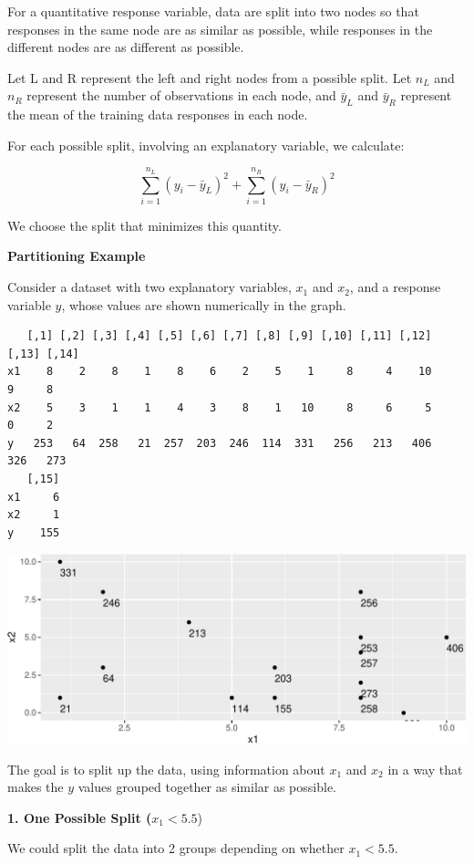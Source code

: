 \documentclass[
  letterpaper,
  DIV=11,
  numbers=noendperiod]{scrreprt}
\begin{document}
For a quantitative response variable, data are split into two nodes so
that responses in the same node are as similar as possible, while
responses in the different nodes are as different as possible.

Let L and R represent the left and right nodes from a possible split.
Let \(n_L\) and \(n_R\) represent the number of observations in each
node, and \(\bar{y}_L\) and \(\bar{y}_R\) represent the mean of the
training data responses in each node.

For each possible split, involving an explanatory variable, we
calculate:

\[
\displaystyle\sum_{i=1}^{n_L} (y_i -\bar{y}_L)^2 + \displaystyle\sum_{i=1}^{n_R} (y_i -\bar{y}_R)^2
\]

We choose the split that minimizes this quantity.

\textbf{Partitioning Example}

Consider a dataset with two explanatory variables, \(x_1\) and \(x_2\),
and a response variable \(y\), whose values are shown numerically in the
graph.

\begin{verbatim}
   [,1] [,2] [,3] [,4] [,5] [,6] [,7] [,8] [,9] [,10] [,11] [,12] [,13] [,14]
x1    8    2    8    1    8    6    2    5    1     8     4    10     9     8
x2    5    3    1    1    4    3    8    1   10     8     6     5     0     2
y   253   64  258   21  257  203  246  114  331   256   213   406   326   273
   [,15]
x1     6
x2     1
y    155
\end{verbatim}

\includegraphics{Ch7_files/figure-pdf/unnamed-chunk-51-1.pdf}

The goal is to split up the data, using information about \(x_1\) and
\(x_2\) in a way that makes the \(y\) values grouped together as similar
as possible.

\textbf{1. One Possible Split (}\(x_1 < 5.5\))

We could split the data into 2 groups depending on whether
\(x_1 < 5.5\).
\end{document}
